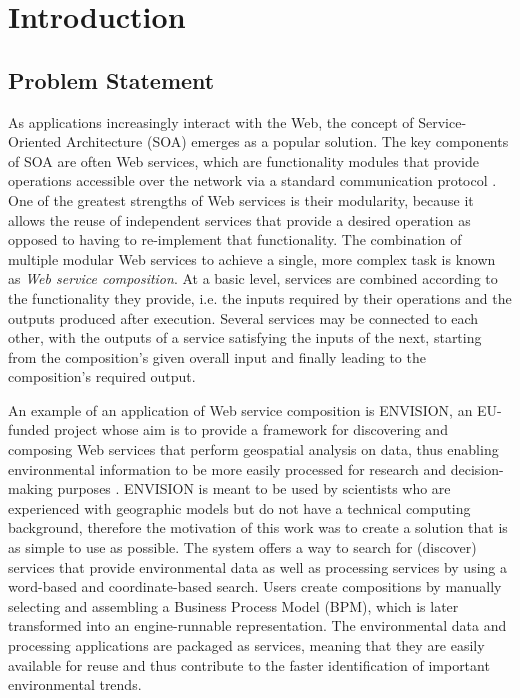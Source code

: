 \chapter{Introduction}\label{C:intro}

\section{Problem Statement}
As applications increasingly interact with the Web, the concept of Service-Oriented Architecture (SOA) \cite{perrey2003service}
emerges as a popular solution. The key components of SOA are often Web services, which are functionality modules that
provide operations accessible over the network via a standard communication protocol \cite{gottschalk2002introduction}. One of the greatest strengths of Web services is their modularity, because it allows the reuse of independent services that provide a
desired operation as opposed to having to re-implement that functionality. The combination of multiple modular Web services
to achieve a single, more complex task is known as \textit{Web service composition}. At a basic level, services are combined according to the functionality they provide, i.e. the inputs required by their operations and the outputs produced after execution. Several services may be connected to each other, with the outputs of a service satisfying the inputs of the next, starting from the composition's given overall input and finally leading to the composition's required output.

An example of an application of Web service composition is ENVISION, an EU-funded project whose aim is to provide a framework for discovering and composing Web services that perform geospatial analysis on data, thus enabling environmental information to be more easily processed for research and decision-making purposes \cite{maue2011envision}. ENVISION is
meant to be used by scientists who are experienced with geographic models but do not have a technical computing background, therefore the motivation of this work was to create a solution that is as simple to use as possible. The system offers
a way to search for (discover) services that provide environmental data as well as processing services by using a
word-based and coordinate-based search. Users create compositions by manually selecting and assembling a Business Process Model (BPM), which is later transformed into an engine-runnable representation. The environmental data and processing applications are packaged as services, meaning that they are easily available for reuse and thus contribute to the faster identification of important environmental trends.

